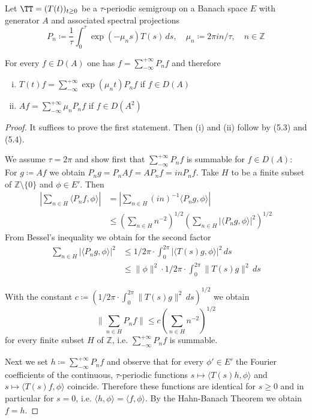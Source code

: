\newpage
\begin{theorem}\label{thm:a3-5.4}
	
	Let $\TT = (T(t))_{t \geq 0}$ be a $\tau$-periodic semigroup on a Banach space $E$ with generator $A$ and associated spectral projections
	\[
	P_{n} \coloneqq  \frac{1}{\tau}\int_{0}^{\tau} \exp(-\mu_{n}s)T(s) \, ds, \quad \mu_{n} \coloneqq 2\pi in/\tau, \quad n \in \mathbb{Z}
	\]
	
	For every $f \in D(A)$ one has $f = \sum_{-\infty}^{+\infty} P_{n}f$ and therefore
	\begin{enumerate}[(i)]
		\item $T(t)f = \sum_{-\infty}^{+\infty} \exp(\mu_{n}t)P_{n}f$ \quad if $f \in D(A)$
		
		\item $Af = \sum_{-\infty}^{+\infty} \mu_{n}P_{n}f$ \quad if $f \in D(A^{2})$
	\end{enumerate}
\end{theorem}

\begin{proof}
	It suffices to prove the first statement. Then (i) and (ii) follow by (5.3) and (5.4).
	
	We assume $\tau = 2\pi$ and show first that $\sum_{-\infty}^{+\infty} P_{n}f$ is summable for $f \in D(A)$: For $g \coloneqq Af$ we obtain $P_{n}g = P_{n}Af = AP_{n}f = inP_{n}f$.
	Take $H$ to be a finite subset of $\mathbb{Z} \setminus \{0\}$ and $\phi \in E'$. Then
	\begin{align*}
		|\sum_{n \in H} \langle P_{n}f,\phi \rangle| &= |\sum_{n \in H} (in)^{-1} \langle P_{n}g,\phi \rangle| \\
		&\leq (\sum_{n \in H} n^{-2})^{1/2}(\sum_{n \in H} |\langle P_{n}g,\phi \rangle|^{2})^{1/2}
	\end{align*}
	From Bessel's inequality we obtain for the second factor
	\begin{align*}
		\sum_{n \in H} |\langle P_{n}g,\phi \rangle|^{2} &\leq 1/2\pi \cdot \int_{0}^{2\pi} |\langle T(s)g,\phi \rangle|^{2} \, ds \\
		&\leq \|\phi\|^{2} \cdot 1/2\pi \cdot \int_{0}^{2\pi} \|T(s)g\|^{2} \, ds
	\end{align*}
	
	With the constant $c \coloneqq (1/2\pi \cdot \int_{0}^{2\pi} \|T(s)g\|^{2} \, ds)^{1/2}$ we obtain
	\[
	\|\sum_{n \in H} P_{n}f\| \leq c(\sum_{n \in H} n^{-2})^{1/2}
	\]
	for every finite subset $H$ of $\mathbb{Z}$, i.e. $\sum_{-\infty}^{+\infty} P_{n}f$ is summable.
	
	Next we set $h \coloneqq \sum_{-\infty}^{+\infty} P_{n}f$ and observe that for every $\phi' \in E'$ the Fourier coefficients of the continuous, $\tau$-periodic functions
	$s \mapsto \langle T(s)h,\phi \rangle$ and $s \mapsto \langle T(s)f,\phi \rangle$
	coincide.
	Therefore these functions are identical for $s \geq 0$ and in particular for $s = 0$, i.e. $\langle h,\phi \rangle = \langle f,\phi \rangle$.
	By the Hahn-Banach Theorem we obtain $f = h$.
\end{proof}

